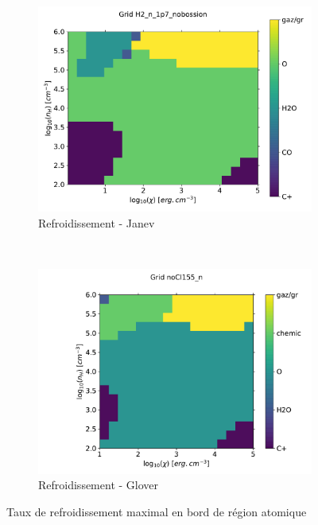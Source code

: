 \begin{figure}[!htbp]
    \begin{subfigure}[t]{0.45\textwidth} %
        \centering \includegraphics[trim = {0 0 0 0 },clip,width=1\textwidth]{figure/H2/JanevGlover/janev/mapLmax.pdf}
        \caption{Refroidissement - Janev}
    \end{subfigure}
    ~ 
    \begin{subfigure}[t]{0.45\textwidth}
        \centering \includegraphics[trim = {0 0 0 0 },clip,width=1\textwidth]{figure/H2/JanevGlover/glover/mapLmax.pdf}
        \caption{Refroidissement - Glover}
    \end{subfigure}
    \caption{Taux de refroidissement maximal en bord de région atomique}
    
    \label{fig:H2:JanevGlover:Lmax}
\end{figure}

